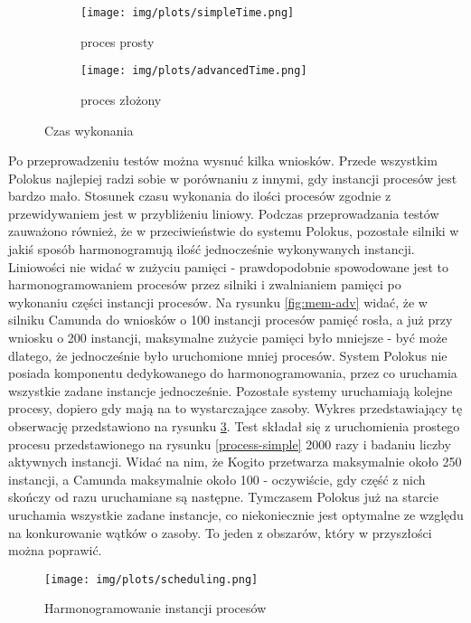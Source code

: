 \documentclass[declaration,shortabstract,mgr]{iithesis}
\begin{document}
\begin{figure}[H]
     \centering
     \begin{subfigure}[b]{0.49\textwidth}
         \centering
         \texttt{[image: img/plots/simpleTime.png]}
         \caption{proces prosty}
     \end{subfigure}
     \hfill
     \begin{subfigure}[b]{0.49\textwidth}
         \centering
         \texttt{[image: img/plots/advancedTime.png]}
         \caption{proces złożony}
         \label{fig:time-adv}
     \end{subfigure}
        \caption{Czas wykonania}
        \label{fig:time}
\end{figure}

Po przeprowadzeniu testów można wysnuć kilka wniosków. Przede wszystkim Polokus najlepiej radzi sobie w porównaniu z innymi, gdy instancji procesów jest bardzo mało. Stosunek czasu wykonania do ilości procesów zgodnie z przewidywaniem jest w przybliżeniu liniowy. Podczas przeprowadzania testów zauważono również, że w przeciwieństwie do systemu Polokus, pozostałe silniki w jakiś sposób harmonogramują ilość jednocześnie wykonywanych instancji. Liniowości nie widać w zużyciu pamięci - prawdopodobnie spowodowane jest to harmonogramowaniem procesów przez silniki i zwalnianiem pamięci po wykonaniu części instancji procesów. Na rysunku \ref{fig:mem-adv} widać, że w silniku Camunda do wniosków o 100 instancji procesów pamięć rosła, a już przy wniosku o 200 instancji, maksymalne zużycie pamięci było mniejsze - być może dlatego, że jednocześnie było uruchomione mniej procesów. System Polokus nie posiada komponentu dedykowanego do harmonogramowania, przez co uruchamia wszystkie zadane instancje jednocześnie. Pozostałe systemy uruchamiają kolejne procesy, dopiero gdy mają na to wystarczające zasoby. Wykres przedstawiający tę obserwację przedstawiono na rysunku \ref{fig:scheduling}. Test składał się z uruchomienia prostego procesu przedstawionego na rysunku \ref{process-simple} 2000 razy i badaniu liczby aktywnych instancji. Widać na nim, że Kogito przetwarza maksymalnie około 250 instancji, a Camunda maksymalnie około 100 - oczywiście, gdy część z nich skończy od razu uruchamiane są następne. Tymczasem Polokus już na starcie uruchamia wszystkie zadane instancje, co niekoniecznie jest optymalne ze względu na konkurowanie wątków o zasoby. To jeden z obszarów,
który w przyszłości można poprawić.

\begin{figure}[h]
     \centering
     \texttt{[image: img/plots/scheduling.png]}
     \caption{Harmonogramowanie instancji procesów}
     \label{fig:scheduling}
\end{figure}
\end{document}
